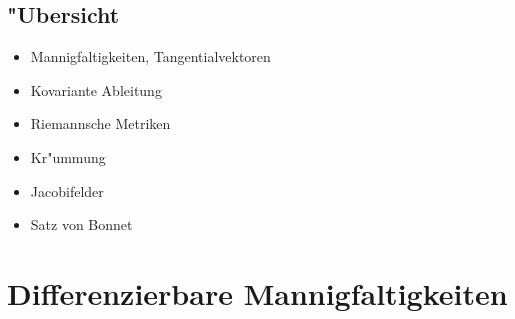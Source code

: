 
\section*{"Ubersicht}

\begin{itemize}
\item Mannigfaltigkeiten, Tangentialvektoren
\item Kovariante Ableitung
\item Riemannsche Metriken
\item Kr"ummung
\item Jacobifelder
\item Satz von Bonnet
\end{itemize}

\chapter{Differenzierbare Mannigfaltigkeiten}

